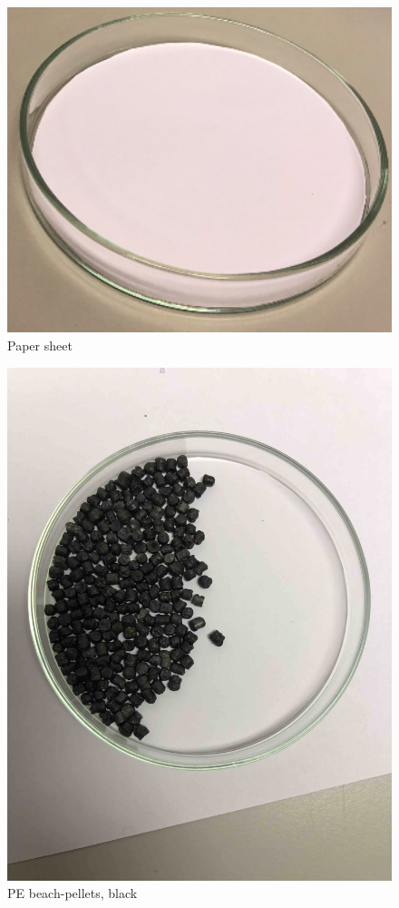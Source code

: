 \begin{appendices}
\begin{figure}
    \centering
    \includegraphics[width = 12cm]{Images/appendix/papir.png}
    \caption{Paper sheet}
    \label{fig:paper}
\end{figure}

\begin{figure}
    \centering
    \includegraphics[width = 12cm]{Images/appendix/PE-pellets-beached-texel-black.jpg}
    \caption{PE beach-pellets, black}
    \label{fig:pe_beach_b}
\end{figure}


\end{appendices}
